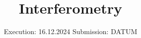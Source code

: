 

\subject{v64}
\title{Interferometry}
\date{%
  Execution: 16.12.2024
  \hspace{3em}
  Submission: DATUM
}



\maketitle
\thispagestyle{empty}
\tableofcontents
\newpage






\printbibliography{}


